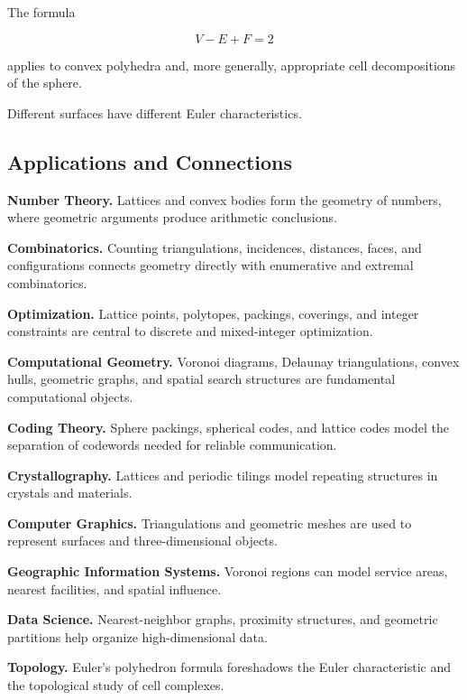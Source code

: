 The formula

\[
V-E+F=2
\]

applies to convex polyhedra and, more generally, appropriate cell
decompositions of the sphere.

Different surfaces have different Euler characteristics.

\subsection{Applications and Connections}
\label{subsec:discrete-geometry-applications}

\begin{applicationbox}
\textbf{Number Theory.}
Lattices and convex bodies form the geometry of numbers, where geometric
arguments produce arithmetic conclusions.

\medskip

\textbf{Combinatorics.}
Counting triangulations, incidences, distances, faces, and configurations
connects geometry directly with enumerative and extremal combinatorics.

\medskip

\textbf{Optimization.}
Lattice points, polytopes, packings, coverings, and integer constraints are
central to discrete and mixed-integer optimization.

\medskip

\textbf{Computational Geometry.}
Voronoi diagrams, Delaunay triangulations, convex hulls, geometric graphs,
and spatial search structures are fundamental computational objects.

\medskip

\textbf{Coding Theory.}
Sphere packings, spherical codes, and lattice codes model the separation of
codewords needed for reliable communication.

\medskip

\textbf{Crystallography.}
Lattices and periodic tilings model repeating structures in crystals and
materials.

\medskip

\textbf{Computer Graphics.}
Triangulations and geometric meshes are used to represent surfaces and
three-dimensional objects.

\medskip

\textbf{Geographic Information Systems.}
Voronoi regions can model service areas, nearest facilities, and spatial
influence.

\medskip

\textbf{Data Science.}
Nearest-neighbor graphs, proximity structures, and geometric partitions help
organize high-dimensional data.

\medskip

\textbf{Topology.}
Euler's polyhedron formula foreshadows the Euler characteristic and the
topological study of cell complexes.
\end{applicationbox}

